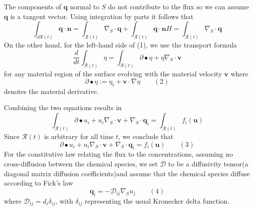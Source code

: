 \documentclass[notheorems,serif]{beamer}
\begin{document}
\begin{frame}
The components of $\boldsymbol{q}$ normal to $S$ do not contribute to the flux so we can assume $\boldsymbol{q}$ is a tangent vector. Using integration by parts it follows that
\begin{equation*}
\int_{\partial\mathcal{R}(t)}\boldsymbol{q}\cdot\boldsymbol{n}=\int_{\mathcal{R}(t)}\nabla_S\cdot\boldsymbol{q}+\int_{\mathcal{R}(t)}\boldsymbol{q}\cdot\boldsymbol{n}H=\int_{\mathcal{R}(t)}\nabla_S\cdot\boldsymbol{q}
\end{equation*}
On the other hand, for the left-hand side of (1), we use the transport formula
\begin{equation*}
\frac{d}{dt}\int_{\mathcal{R}(t)}\eta=\int_{\mathcal{R}(t)}\partial\bullet\eta+\eta\nabla_S\cdot \boldsymbol{v}
\end{equation*}
for any material region of the surface evolving with the material velocity $\boldsymbol{v}$ where
\begin{equation*}
\partial\bullet\eta:=\eta_t+\boldsymbol{v}\cdot\nabla\eta\qquad(2)
\end{equation*}
denotes the material derivative. 
\end{frame}
\begin{frame}
Combining the two equations results in
\begin{equation*}
\int_{\mathcal{R}(t)}\partial\bullet u_i+u_i\nabla_S\cdot\boldsymbol{v}+\nabla_S\cdot\boldsymbol{q}_i=\int_{\mathcal{R}(t)}f_i(\boldsymbol{u})
\end{equation*}
Since $\mathcal{R}(t)$ is arbitrary for all time $t$, we conclude that
\begin{equation*}
\partial\bullet u_i+u_i\nabla_S\cdot\boldsymbol{v}+\nabla_S\cdot\boldsymbol{q}_i=f_i(\boldsymbol{u})\qquad(3)
\end{equation*}
For the constitutive law relating the flux to the concentrations, assuming no cross-diffusion between the chemical species, we set $
\mathcal{D}$ to be a diffusivity tensor(a diagonal matrix diffusion coefficients)and assume that the chemical species diffuse according to Fick's law
\begin{equation*}
\boldsymbol{q}_i=-\mathcal{D}_{ij}\nabla_Su_j\qquad(4)
\end{equation*}
where $\mathcal{D}_{ij}=d_i\delta_{ij}$, with $\delta_{ij}$ representing the usual Kronecker delta function.
\end{frame}
\end{document}
